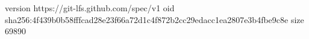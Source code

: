 version https://git-lfs.github.com/spec/v1
oid sha256:4f439b0b58fffcad28e23f66a72d1c4f872b2cc29edacc1ea2807e3b4fbe9c8e
size 69890
